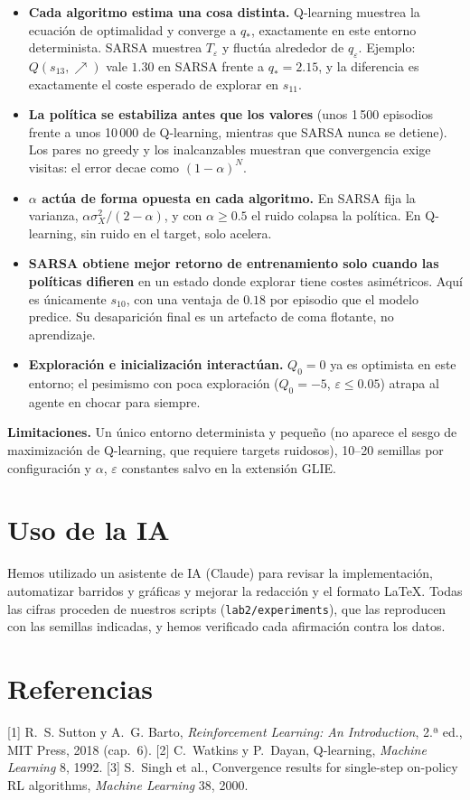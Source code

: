 \documentclass[11pt,a4paper]{article}
\newcommand{\UR}{{\nearrow}}
\newcommand{\qe}{q_\varepsilon}
\begin{document}
\begin{itemize}\itemsep1pt
\item \textbf{Cada algoritmo estima una cosa distinta.} Q-learning muestrea la ecuación de optimalidad y converge a $q_*$, exactamente en este entorno determinista. SARSA muestrea $T_\varepsilon$ y fluctúa alrededor de $\qe$. Ejemplo: $Q(s_{13},\UR)$ vale $1.30$ en SARSA frente a $q_*=2.15$, y la diferencia es exactamente el coste esperado de explorar en $s_{11}$.
\item \textbf{La política se estabiliza antes que los valores} (unos 1\,500 episodios frente a unos 10\,000 de Q-learning, mientras que SARSA nunca se detiene). Los pares no greedy y los inalcanzables muestran que convergencia exige visitas: el error decae como $(1-\alpha)^N$.
\item \textbf{$\alpha$ actúa de forma opuesta en cada algoritmo.} En SARSA fija la varianza, $\alpha\sigma_X^2/(2-\alpha)$, y con $\alpha\ge0.5$ el ruido colapsa la política. En Q-learning, sin ruido en el target, solo acelera.
\item \textbf{SARSA obtiene mejor retorno de entrenamiento solo cuando las políticas difieren} en un estado donde explorar tiene costes asimétricos. Aquí es únicamente $s_{10}$, con una ventaja de $0.18$ por episodio que el modelo predice. Su desaparición final es un artefacto de coma flotante, no aprendizaje.
\item \textbf{Exploración e inicialización interactúan.} $Q_0=0$ ya es optimista en este entorno; el pesimismo con poca exploración ($Q_0=-5$, $\varepsilon\le0.05$) atrapa al agente en chocar para siempre.
\end{itemize}

\textbf{Limitaciones.} Un único entorno determinista y pequeño (no aparece el sesgo de maximización de Q-learning, que requiere targets ruidosos), 10--20 semillas por configuración y $\alpha$, $\varepsilon$ constantes salvo en la extensión GLIE.

\section*{Uso de la IA}
Hemos utilizado un asistente de IA (Claude) para revisar la implementación, automatizar barridos y gráficas y mejorar la redacción y el formato LaTeX. Todas las cifras proceden de nuestros scripts (\texttt{lab2/experiments}), que las reproducen con las semillas indicadas, y hemos verificado cada afirmación contra los datos.

\section*{Referencias}
{\small [1] R.~S. Sutton y A.~G. Barto, \emph{Reinforcement Learning: An Introduction}, 2.ª ed., MIT Press, 2018 (cap.~6).
[2] C.~Watkins y P.~Dayan, Q-learning, \emph{Machine Learning} 8, 1992.
[3] S.~Singh et al., Convergence results for single-step on-policy RL algorithms, \emph{Machine Learning} 38, 2000.\par}
\end{document}

